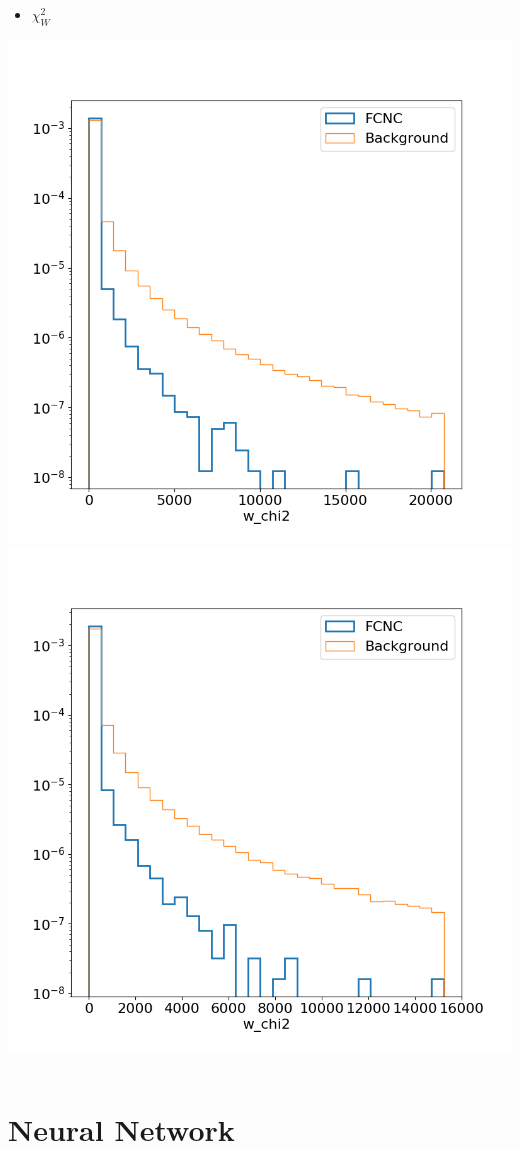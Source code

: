\documentclass[10pt]{beamer}
\begin{document}
{\begin{columns}
\begin{column}{0.33\textwidth}
\begin{itemize}
\item $\chi^2_{W}$
\end{itemize}
\includegraphics[width=.8\textwidth]{Images/ejetsvarplots/w_chi2.png} \\
\includegraphics[width=.8\textwidth]{Images/mujetsvarplots/w_chi2.png}
\end{column}
\end{columns}
}

\section{Neural Network}
\end{document}
